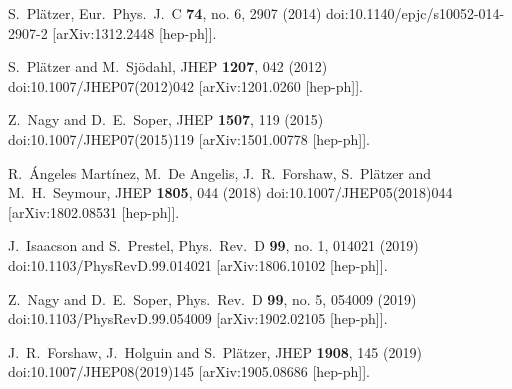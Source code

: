 \documentclass[11pt,a4paper]{article}
\begin{document}
\begin{thebibliography}{99}
  S.~Pl\"atzer,
  Eur.\ Phys.\ J.\ C {\bf 74}, no. 6, 2907 (2014)
  doi:10.1140/epjc/s10052-014-2907-2
  [arXiv:1312.2448 [hep-ph]].


  S.~Pl\"atzer and M.~Sj\"odahl,
  JHEP {\bf 1207}, 042 (2012)
  doi:10.1007/JHEP07(2012)042
  [arXiv:1201.0260 [hep-ph]].


  Z.~Nagy and D.~E.~Soper,
  JHEP {\bf 1507}, 119 (2015)
  doi:10.1007/JHEP07(2015)119
  [arXiv:1501.00778 [hep-ph]].


  R.~\'Angeles Mart\'inez, M.~De Angelis, J.~R.~Forshaw, S.~Pl\"atzer and M.~H.~Seymour,
  JHEP {\bf 1805}, 044 (2018)
  doi:10.1007/JHEP05(2018)044
  [arXiv:1802.08531 [hep-ph]].


  J.~Isaacson and S.~Prestel,
  Phys.\ Rev.\ D {\bf 99}, no. 1, 014021 (2019)
  doi:10.1103/PhysRevD.99.014021
  [arXiv:1806.10102 [hep-ph]].


  Z.~Nagy and D.~E.~Soper,
  Phys.\ Rev.\ D {\bf 99}, no. 5, 054009 (2019)
  doi:10.1103/PhysRevD.99.054009
  [arXiv:1902.02105 [hep-ph]].


  J.~R.~Forshaw, J.~Holguin and S.~Pl\"atzer,
  JHEP {\bf 1908}, 145 (2019)
  doi:10.1007/JHEP08(2019)145
  [arXiv:1905.08686 [hep-ph]].



\end{thebibliography}
\end{document}
